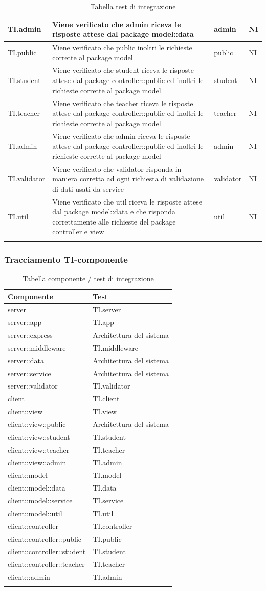 \documentclass[12pt,a4paper]{article}
\begin{document}
\begin{longtable}{l p{8cm} l l}
		\midrule
		TI.admin & Viene verificato che admin riceva le risposte attese dal package model::data & admin & NI\tabularnewline
		\midrule
		TI.public & Viene verificato che public inoltri le richieste corrette al package model & public & NI\tabularnewline
		\midrule
		TI.student & Viene verificato che student riceva le risposte attese dal package controller::public ed inoltri le richieste corrette al package model & student & NI\tabularnewline
		\midrule
		TI.teacher & Viene verificato che teacher riceva le risposte attese dal package controller::public ed inoltri le richieste corrette al package model & teacher & NI\tabularnewline
		\midrule
		TI.admin & Viene verificato che admin riceva le risposte attese dal package controller::public ed inoltri le richieste corrette al package model & admin & NI\tabularnewline
		\midrule
		TI.validator & Viene verificato che validator risponda in maniera corretta ad ogni richiesta di validazione di dati usati da service & validator & NI\tabularnewline
		\midrule
		TI.util & Viene verificato che util riceva le risposte attese dal package model::data e che risponda correttamente alle richieste del package controller e view & util & NI\tabularnewline
		\midrule
		\caption{Tabella test di integrazione} \tabularnewline
	\end{longtable}
	\subsubsection{Tracciamento TI-componente}
	\begin{longtable}{l l}
		\midrule
		\textbf{Componente} & \textbf{Test}\tabularnewline
		\midrule
		\midrule
		server & TI.server\tabularnewline
		\midrule
		server::app & TI.app\tabularnewline
		\midrule
		server::express & Architettura del sistema\tabularnewline
		\midrule
		server::middleware & TI.middleware\tabularnewline
		\midrule
		server::data & Architettura del sistema\tabularnewline
		\midrule
		server::service & Architettura del sistema\tabularnewline
		\midrule
		server::validator & TI.validator\tabularnewline
		\midrule
		client & TI.client\tabularnewline
		\midrule
		client::view & TI.view\tabularnewline
		\midrule
		client::view::public & Architettura del sistema\tabularnewline
		\midrule
		client::view::student & TI.student\tabularnewline
		\midrule
		client::view::teacher & TI.teacher\tabularnewline
		\midrule
		client::view::admin & TI.admin\tabularnewline
		\midrule
		client::model & TI.model\tabularnewline
		\midrule
		client::model::data & TI.data\tabularnewline
		\midrule
		client::model::service & TI.service\tabularnewline
		\midrule
		client::model::util & TI.util\tabularnewline
		\midrule
		client::controller & TI.controller\tabularnewline
		\midrule
		client::controller::public & TI.public\tabularnewline
		\midrule
		client::controller::student & TI.student\tabularnewline
		\midrule
		client::controller::teacher & TI.teacher\tabularnewline
		\midrule
		client:::admin & TI.admin\tabularnewline
		\midrule
		\caption{Tabella componente / test di integrazione} \tabularnewline
	\end{longtable}
\end{document}
